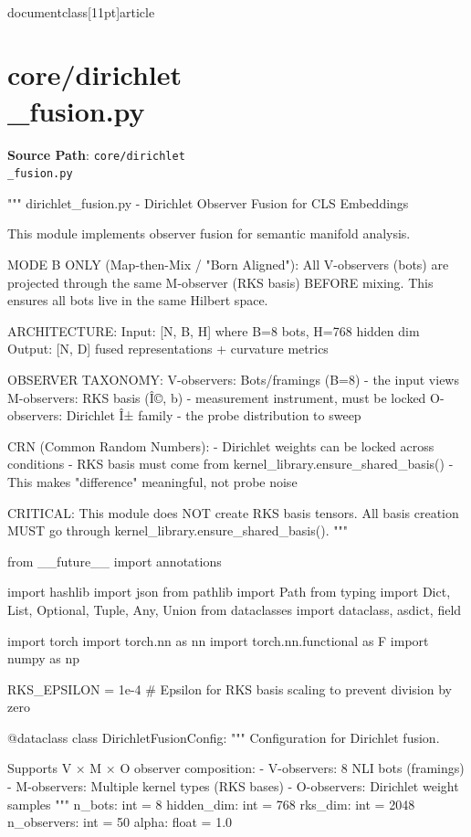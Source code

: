 \\documentclass[11pt]{article}
\begin{document}
\section*{core/dirichlet\\_fusion.py}
\textbf{Source Path}: \texttt{core/dirichlet\\_fusion.py}\par
\bigskip
\begin{CodeBlock}
"""
dirichlet_fusion.py - Dirichlet Observer Fusion for CLS Embeddings

This module implements observer fusion for semantic manifold analysis.

MODE B ONLY (Map-then-Mix / "Born Aligned"):
All V-observers (bots) are projected through the same M-observer (RKS basis)
BEFORE mixing. This ensures all bots live in the same Hilbert space.

ARCHITECTURE:
    Input: [N, B, H] where B=8 bots, H=768 hidden dim
    Output: [N, D] fused representations + curvature metrics

OBSERVER TAXONOMY:
    V-observers: Bots/framings (B=8) - the input views
    M-observers: RKS basis (Î©, b) - measurement instrument, must be locked
    O-observers: Dirichlet Î± family - the probe distribution to sweep

CRN (Common Random Numbers):
    - Dirichlet weights can be locked across conditions
    - RKS basis must come from kernel_library.ensure_shared_basis()
    - This makes "difference" meaningful, not probe noise

CRITICAL: This module does NOT create RKS basis tensors.
All basis creation MUST go through kernel_library.ensure_shared_basis().
"""

from __future__ import annotations

import hashlib
import json
from pathlib import Path
from typing import Dict, List, Optional, Tuple, Any, Union
from dataclasses import dataclass, asdict, field

import torch
import torch.nn as nn
import torch.nn.functional as F
import numpy as np

RKS_EPSILON = 1e-4 # Epsilon for RKS basis scaling to prevent division by zero


@dataclass
class DirichletFusionConfig:
    """
    Configuration for Dirichlet fusion.
    
    Supports V × M × O observer composition:
    - V-observers: 8 NLI bots (framings)
    - M-observers: Multiple kernel types (RKS bases)
    - O-observers: Dirichlet weight samples
    """
    n_bots: int = 8
    hidden_dim: int = 768
    rks_dim: int = 2048
    n_observers: int = 50
    alpha: float = 1.0
    

\end{CodeBlock}
\end{document}
